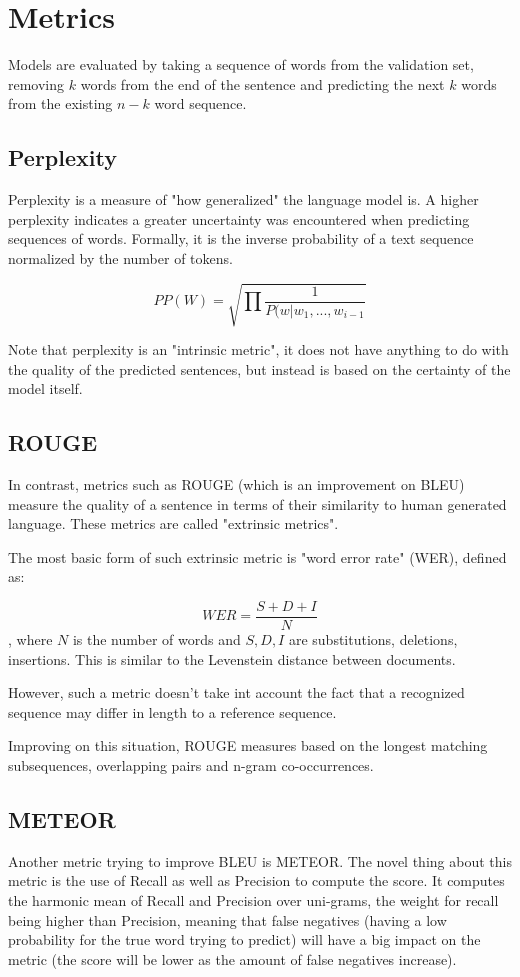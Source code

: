 \documentclass[a4paper]{article}
\begin{document}
\section{Metrics}
\label{sec:metrics}

Models are evaluated by taking a sequence
of words from the validation set, removing
$k$ words from the end of the sentence and predicting
the next $k$ words from the existing $n - k$ word sequence.

\subsection{Perplexity}
\label{sec:perplexity}

Perplexity is a measure of "how generalized" the language
model is. A higher perplexity indicates a greater uncertainty
was encountered when predicting sequences of words. Formally,
it is the inverse probability of a text sequence normalized
by the number of tokens.

$$ PP(W) = \sqrt{\prod \frac{1}{P(w|w_1, ..., w_{i - 1}}} $$

Note that perplexity is an "intrinsic metric", it does not
have anything to do with the quality of the predicted
sentences, but instead is based on the certainty of the
model itself.

\subsection{ROUGE}
\label{sec:rouge}

In contrast, metrics such as ROUGE (which is an improvement
on BLEU) measure the quality of a sentence in terms of
their similarity to human generated language. These metrics
are called "extrinsic metrics".

The most basic form of such extrinsic metric is "word error
rate" (WER), defined as:

$$ WER = \frac{S + D + I}{N} $$, where $N$ is the number of
words and $S, D, I$ are substitutions, deletions, insertions.
This is similar to the Levenstein distance between documents.

However, such a metric doesn't take int account the fact that
a recognized sequence may differ in length to a reference
sequence.

Improving on this situation, ROUGE measures based on the
longest matching subsequences, overlapping pairs and n-gram
co-occurrences.

\subsection{METEOR}
\label{sec:meteor}
Another metric trying to improve BLEU is
METEOR. The novel thing about this metric is the use of Recall as well as
Precision to compute the score. It computes the harmonic mean of Recall and
Precision over uni-grams, the weight for recall being higher than Precision,
meaning that false negatives (having a low probability for the true word trying
to predict) will have a big impact on the metric (the score will be lower as the
amount of false negatives increase).
\end{document}
